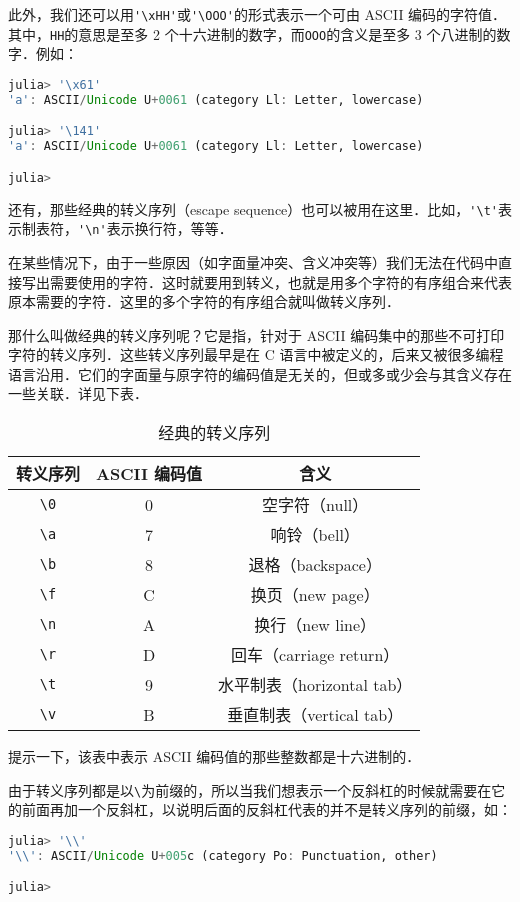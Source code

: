 此外，我们还可以用\verb|'\xHH'|或\verb|'\OOO'|的形式表示一个可由 ASCII 编码的字符值．其中，\verb|HH|的意思是至多 2 个十六进制的数字，而\verb|OOO|的含义是至多 3 个八进制的数字．例如：
\begin{lstlisting}[language=julia]
julia> '\x61'
'a': ASCII/Unicode U+0061 (category Ll: Letter, lowercase)

julia> '\141'
'a': ASCII/Unicode U+0061 (category Ll: Letter, lowercase)

julia> 
\end{lstlisting}

还有，那些经典的转义序列（escape sequence）也可以被用在这里．比如，\verb|'\t'|表示制表符，\verb|'\n'|表示换行符，等等．

在某些情况下，由于一些原因（如字面量冲突、含义冲突等）我们无法在代码中直接写出需要使用的字符．这时就要用到转义，也就是用多个字符的有序组合来代表原本需要的字符．这里的多个字符的有序组合就叫做转义序列．

那什么叫做经典的转义序列呢？它是指，针对于 ASCII 编码集中的那些不可打印字符的转义序列．这些转义序列最早是在 C 语言中被定义的，后来又被很多编程语言沿用．它们的字面量与原字符的编码值是无关的，但或多或少会与其含义存在一些关联．详见下表．
\begin{table}[ht]
\centering
\caption{经典的转义序列}\label{JuC6S2_tab1}
\begin{tabular}{|c|c|c|}
\hline
转义序列 & ASCII 编码值 & 含义 \\
\hline
\verb|\0| & 0 & 空字符（null） \\
\hline
\verb|\a| & 7 & 响铃（bell） \\
\hline
\verb|\b| & 8 & 退格（backspace） \\
\hline
\verb|\f| & C & 换页（new page） \\
\hline
\verb|\n| & A & 换行（new line） \\
\hline
\verb|\r| & D & 回车（carriage return） \\
\hline
\verb|\t| & 9 & 水平制表（horizontal tab） \\
\hline
\verb|\v| & B & 垂直制表（vertical tab） \\
\hline
\end{tabular}
\end{table}

提示一下，该表中表示 ASCII 编码值的那些整数都是十六进制的．

由于转义序列都是以\verb|\|为前缀的，所以当我们想表示一个反斜杠的时候就需要在它的前面再加一个反斜杠，以说明后面的反斜杠代表的并不是转义序列的前缀，如：
\begin{lstlisting}[language=julia]
julia> '\\'
'\\': ASCII/Unicode U+005c (category Po: Punctuation, other)

julia> 
\end{lstlisting}

